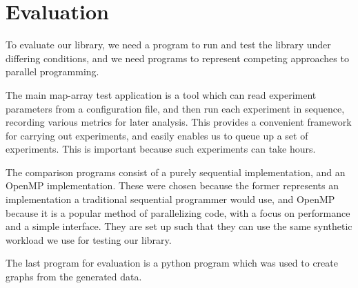 \section{Evaluation}

To evaluate our library, we need a program to run and test the library under differing conditions, and we need programs to represent competing approaches to parallel programming. 

The main map-array test application is a tool which can read experiment parameters from a configuration file, and then run each experiment in sequence, recording various metrics for later analysis. This provides a convenient framework for carrying out experiments, and easily enables us to queue up a set of experiments. This is important because such experiments can take hours.

The comparison programs consist of a purely sequential implementation, and an OpenMP implementation. These were chosen because the former represents an implementation a traditional sequential programmer would use, and OpenMP because it is a popular method of parallelizing code, with a focus on performance and a simple interface. They are set up such that they can use the same synthetic workload we use for testing our library.

The last program for evaluation is a python program which was used to create graphs from the generated data.